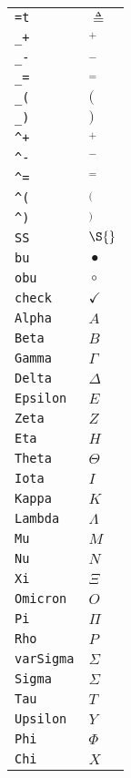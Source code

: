 \begin{longtable}{ll}
\texttt{=t}&${}\triangleq {}$\\
\texttt{\_+}&${}_+ {}$\\
\texttt{\_{-}}&${}_- {}$\\
\texttt{\_=}&${}_= {}$\\
\texttt{\_(}&${}( {}$\\
\texttt{\_)}&${}) {}$\\
\texttt{\textasciicircum +}&${}^+ {}$\\
\texttt{\textasciicircum {-}}&${}^- {}$\\
\texttt{\textasciicircum =}&${}^= {}$\\
\texttt{\textasciicircum (}&${}^( {}$\\
\texttt{\textasciicircum )}&${}^) {}$\\
\texttt{SS}&${}\S {}$\\
\texttt{bu}&${}\bullet {}$\\
\texttt{obu}&${}\circ {}$\\
\texttt{check}&${}\checkmark {}$\\
\texttt{Alpha}&${}A {}$\\
\texttt{Beta}&${}B {}$\\
\texttt{Gamma}&${}\Gamma {}$\\
\texttt{Delta}&${}\Delta {}$\\
\texttt{Epsilon}&${}E {}$\\
\texttt{Zeta}&${}Z {}$\\
\texttt{Eta}&${}H {}$\\
\texttt{Theta}&${}\Theta {}$\\
\texttt{Iota}&${}I {}$\\
\texttt{Kappa}&${}K {}$\\
\texttt{Lambda}&${}\Lambda {}$\\
\texttt{Mu}&${}M {}$\\
\texttt{Nu}&${}N {}$\\
\texttt{Xi}&${}\Xi {}$\\
\texttt{Omicron}&${}O {}$\\
\texttt{Pi}&${}\Pi {}$\\
\texttt{Rho}&${}P {}$\\
\texttt{varSigma}&${}\varSigma {}$\\
\texttt{Sigma}&${}\Sigma {}$\\
\texttt{Tau}&${}T {}$\\
\texttt{Upsilon}&${}Y {}$\\
\texttt{Phi}&${}\Phi {}$\\
\texttt{Chi}&${}X {}$\\

\end{longtable}
